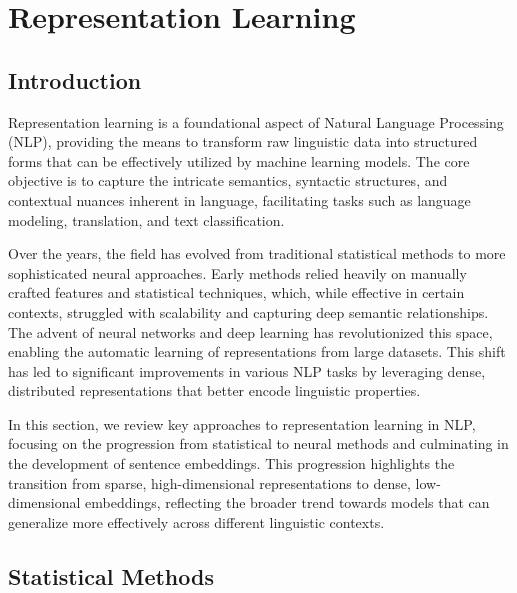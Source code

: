 \section{Representation Learning}

\subsection{Introduction}

Representation learning is a foundational aspect of Natural Language Processing (NLP), providing the means to transform raw linguistic data into structured forms that can be effectively utilized by machine learning models. The core objective is to capture the intricate semantics, syntactic structures, and contextual nuances inherent in language, facilitating tasks such as language modeling, translation, and text classification.

Over the years, the field has evolved from traditional statistical methods to more sophisticated neural approaches. Early methods relied heavily on manually crafted features and statistical techniques, which, while effective in certain contexts, struggled with scalability and capturing deep semantic relationships. The advent of neural networks and deep learning has revolutionized this space, enabling the automatic learning of representations from large datasets. This shift has led to significant improvements in various NLP tasks by leveraging dense, distributed representations that better encode linguistic properties.

In this section, we review key approaches to representation learning in NLP, focusing on the progression from statistical to neural methods and culminating in the development of sentence embeddings. This progression highlights the transition from sparse, high-dimensional representations to dense, low-dimensional embeddings, reflecting the broader trend towards models that can generalize more effectively across different linguistic contexts.





\subsection{Statistical Methods}

